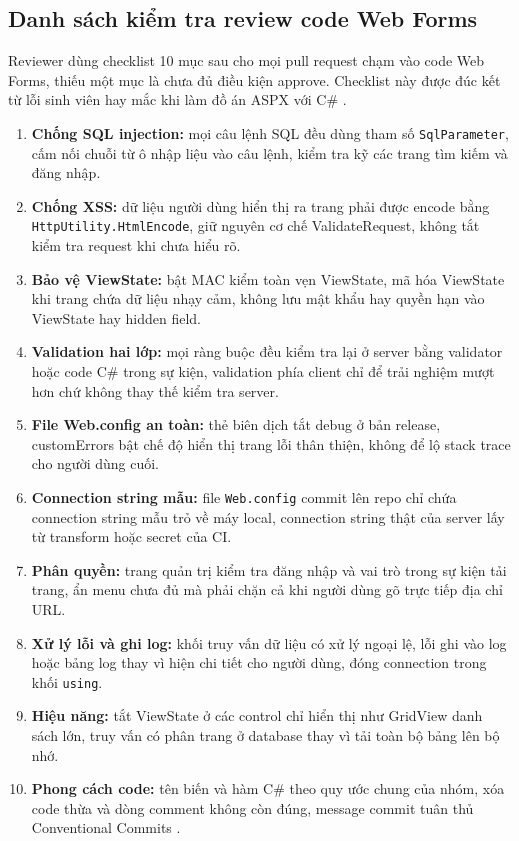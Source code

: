 \subsection{Danh sách kiểm tra review code Web Forms}
\label{subsec:c7-checklist}

Reviewer dùng checklist 10 mục sau cho mọi pull request chạm vào code Web Forms, thiếu một mục là chưa đủ điều kiện approve.
Checklist này được đúc kết từ lỗi sinh viên hay mắc khi làm đồ án ASPX với C\# \cite{msnetfx,githubdocs}.

\begin{enumerate}
\item \textbf{Chống SQL injection:} mọi câu lệnh SQL đều dùng tham số \verb|SqlParameter|, cấm nối chuỗi từ ô nhập liệu vào câu lệnh, kiểm tra kỹ các trang tìm kiếm và đăng nhập.
\item \textbf{Chống XSS:} dữ liệu người dùng hiển thị ra trang phải được encode bằng \verb|HttpUtility.HtmlEncode|, giữ nguyên cơ chế ValidateRequest, không tắt kiểm tra request khi chưa hiểu rõ.
\item \textbf{Bảo vệ ViewState:} bật MAC kiểm toàn vẹn ViewState, mã hóa ViewState khi trang chứa dữ liệu nhạy cảm, không lưu mật khẩu hay quyền hạn vào ViewState hay hidden field.
\item \textbf{Validation hai lớp:} mọi ràng buộc đều kiểm tra lại ở server bằng validator hoặc code C\# trong sự kiện, validation phía client chỉ để trải nghiệm mượt hơn chứ không thay thế kiểm tra server.
\item \textbf{File Web.config an toàn:} thẻ biên dịch tắt debug ở bản release, customErrors bật chế độ hiển thị trang lỗi thân thiện, không để lộ stack trace cho người dùng cuối.
\item \textbf{Connection string mẫu:} file \texttt{Web.config} commit lên repo chỉ chứa connection string mẫu trỏ về máy local, connection string thật của server lấy từ transform hoặc secret của CI.
\item \textbf{Phân quyền:} trang quản trị kiểm tra đăng nhập và vai trò trong sự kiện tải trang, ẩn menu chưa đủ mà phải chặn cả khi người dùng gõ trực tiếp địa chỉ URL.
\item \textbf{Xử lý lỗi và ghi log:} khối truy vấn dữ liệu có xử lý ngoại lệ, lỗi ghi vào log hoặc bảng log thay vì hiện chi tiết cho người dùng, đóng connection trong khối \verb|using|.
\item \textbf{Hiệu năng:} tắt ViewState ở các control chỉ hiển thị như GridView danh sách lớn, truy vấn có phân trang ở database thay vì tải toàn bộ bảng lên bộ nhớ.
\item \textbf{Phong cách code:} tên biến và hàm C\# theo quy ước chung của nhóm, xóa code thừa và dòng comment không còn đúng, message commit tuân thủ Conventional Commits \cite{convcommits}.
\end{enumerate}

